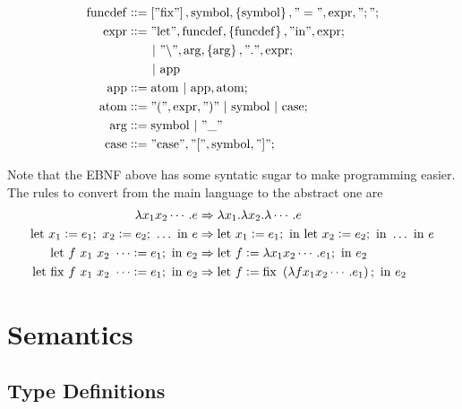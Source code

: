\documentclass[12pt]{article}
\newcommand{\beq}{::=}
\newcommand{\bs}[1]{\mathrm{#1}}
\newcommand{\bstr}[1]{\mathrm{"#1"}}
\begin{document}
\begin{align}
  \bs{funcdef} &\beq \sbr{\bstr{fix}}, \bs{symbol}, \cbr{\bs{symbol}}, \bstr{=}, \bs{expr}, \bstr{;} ;\\
  \bs{expr} &\beq \bstr{let}, \bs{funcdef}, \cbr{\bs{funcdef}}, \bstr{in}, \bs{expr} ;\\
              &\qquad|~ \bstr{\backslash}, \bs{arg}, \cbr{\bs{arg}}, \bstr{.}, \bs{expr} ;\\
                 &\qquad|~ \bs{app}\\
  \bs{app} &\beq \bs{atom} ~|~ \bs{app}, \bs{atom} ;\\
  \bs{atom} &\beq \bstr{(}, \bs{expr}, \bstr{)} ~|~ \bs{symbol} ~|~ \bs{case} ;\\
  \bs{arg} &\beq \bs{symbol} ~|~ \bstr{\_}\\
  \bs{case} &\beq \bstr{case}, \bstr{[}, \bs{symbol}, \bstr{]} ;
\end{align}

Note that the EBNF above has some syntatic sugar to make programming
easier.
The rules to convert from the main language to the abstract one are
\begin{align}
  \lambda x_1 x_2 \cdots. e
  &\Rightarrow \lambda x_1. \lambda x_2. \lambda \cdots. e\\
  \mathrm{let}~x_1 := e_1;~x_2 := e_2;~\ldots~\mathrm{in}~e
  &\Rightarrow \mathrm{let}~x_1 := e_1;~\mathrm{in}~\mathrm{let}~x_2 := e_2;~\mathrm{in}~\ldots~\mathrm{in}~e\\
  \mathrm{let}~f~x_1~x_2~\cdots := e_1;~\mathrm{in}~e_2
  &\Rightarrow \mathrm{let}~f := \lambda x_1 x_2 \cdots. e_1;~\mathrm{in}~e_2\\
  \mathrm{let}~\mathrm{fix}~f~x_1~x_2~\cdots := e_1;~\mathrm{in}~e_2
  &\Rightarrow \mathrm{let}~f := \mathrm{fix}~\del{\lambda f x_1 x_2 \cdots. e_1};~\mathrm{in}~e_2
\end{align}


\section{Semantics}
\label{app:semantics}


\subsection{Type Definitions}
\label{sec:type_defs}
\end{document}
